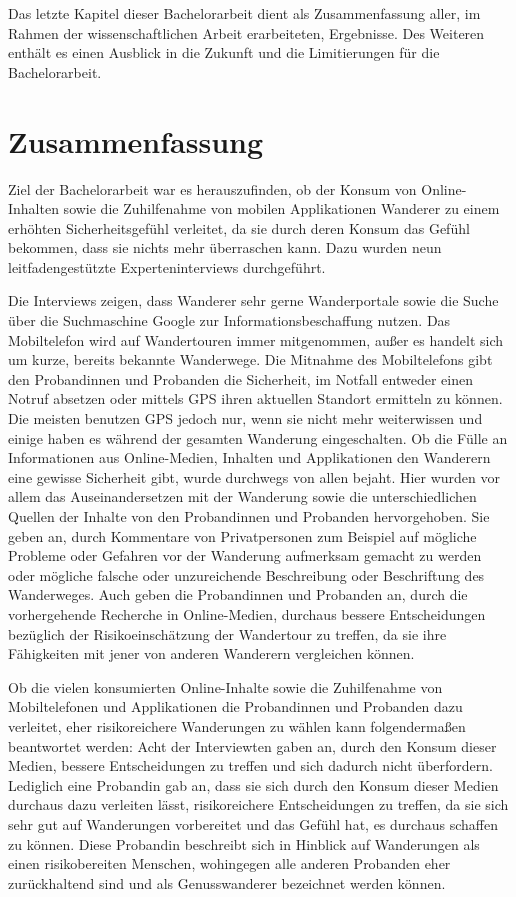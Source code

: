 Das letzte Kapitel dieser Bachelorarbeit dient als Zusammenfassung aller, im Rahmen der wissenschaftlichen Arbeit erarbeiteten, Ergebnisse. Des Weiteren enthält es einen Ausblick in die Zukunft und die Limitierungen für die Bachelorarbeit.


\section{Zusammenfassung}

Ziel der Bachelorarbeit war es herauszufinden, ob der Konsum von Online-Inhalten sowie die Zuhilfenahme von mobilen Applikationen Wanderer zu einem erhöhten Sicherheitsgefühl verleitet, da sie durch deren Konsum das Gefühl bekommen, dass sie nichts mehr überraschen kann. Dazu wurden neun leitfadengestützte Experteninterviews durchgeführt.

Die Interviews zeigen, dass Wanderer sehr gerne Wanderportale sowie die Suche über die Suchmaschine Google zur Informationsbeschaffung nutzen. Das Mobiltelefon wird auf Wandertouren immer mitgenommen, außer es handelt sich um kurze, bereits bekannte Wanderwege. Die Mitnahme des Mobiltelefons gibt den Probandinnen und Probanden die Sicherheit, im Notfall entweder einen Notruf absetzen oder mittels GPS ihren aktuellen Standort ermitteln zu können. Die meisten benutzen GPS jedoch nur, wenn sie nicht mehr weiterwissen und einige haben es während der gesamten Wanderung eingeschalten. Ob die Fülle an Informationen aus Online-Medien, Inhalten und Applikationen den Wanderern eine gewisse Sicherheit gibt, wurde durchwegs von allen bejaht. Hier wurden vor allem das Auseinandersetzen mit der Wanderung sowie die unterschiedlichen Quellen der Inhalte von den Probandinnen und Probanden hervorgehoben. Sie geben an, durch Kommentare von Privatpersonen zum Beispiel auf mögliche Probleme oder Gefahren vor der Wanderung aufmerksam gemacht zu werden oder mögliche falsche oder unzureichende Beschreibung oder Beschriftung des Wanderweges. Auch geben die Probandinnen und Probanden an, durch die vorhergehende Recherche in Online-Medien, durchaus bessere Entscheidungen bezüglich der Risikoeinschätzung der Wandertour zu treffen, da sie ihre Fähigkeiten mit jener von anderen Wanderern  vergleichen können.

Ob die vielen konsumierten Online-Inhalte sowie die Zuhilfenahme von Mobiltelefonen und Applikationen die Probandinnen und Probanden dazu verleitet, eher risikoreichere Wanderungen zu wählen kann folgendermaßen beantwortet werden:
Acht der Interviewten gaben an, durch den Konsum dieser Medien, bessere Entscheidungen zu treffen und sich dadurch nicht überfordern. Lediglich eine Probandin gab an, dass sie sich durch den Konsum dieser Medien durchaus dazu verleiten lässt, risikoreichere Entscheidungen zu treffen, da sie sich sehr gut auf Wanderungen vorbereitet und das Gefühl hat, es durchaus schaffen zu können.
Diese Probandin beschreibt sich in Hinblick auf Wanderungen als einen risikobereiten Menschen, wohingegen alle anderen Probanden eher zurückhaltend sind und als Genusswanderer bezeichnet werden können.

